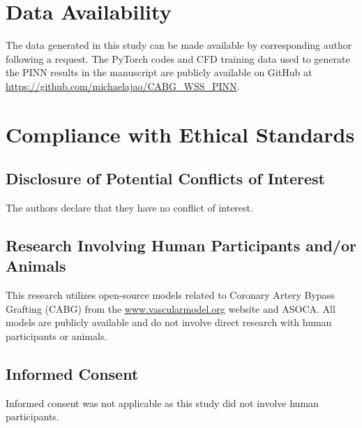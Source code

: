 ﻿\documentclass[12pt,a4paper]{article}
\theoremstyle{definition}
\numberwithin{equation}{section}
\begin{document}
\section*{Data Availability}{The data generated in this study can be made available by corresponding author following a request. {The PyTorch codes and CFD training data used to generate the PINN results in the manuscript are publicly available on GitHub at \url{https://github.com/michaelajao/CABG_WSS_PINN}.}}

\section*{Compliance with Ethical Standards}

\subsection*{Disclosure of Potential Conflicts of Interest}
The authors declare that they have no conflict of interest.

\subsection*{Research Involving Human Participants and/or Animals}
This research utilizes open-source models related to Coronary Artery Bypass Grafting (CABG) from the \url{www.vascularmodel.org} website and ASOCA. All models are publicly available and do not involve direct research with human participants or animals.

\subsection*{Informed Consent}
Informed consent was not applicable as this study did not involve human participants.


\newpage
\clearpage
		
\end{document}
